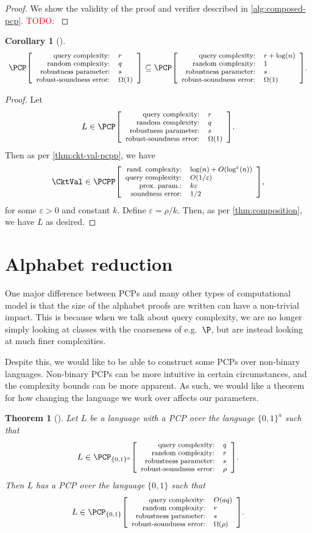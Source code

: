 \documentclass[english,12pt]{reedthesis}
\theoremstyle{plain}
\newtheorem{thm}{Theorem}[section]
\newtheorem{cor}[cor]{Corollary}
\theoremstyle{definition}
\theoremstyle{remark}
\newcommand{\pcpp}[4]{%
  \ensuremath%
  \mleft[{\footnotesize\begin{array}{r l}
    \text{rand.\ complexity:} & #1 \\
    \text{query complexity:} & #2 \\
    \text{prox.\ param.:} & #3 \\
    \text{soundness error:} & #4
  \end{array}}\mright]%
}
\newcommand{\pcpr}[4]{%
  \ensuremath%
  \mleft[{\footnotesize\begin{array}{r l}
    \text{query complexity:} & #1 \\
    \text{random complexity:} & #2 \\
    \text{robustness parameter:} & #3 \\
    \text{robust-soundness error:} & #4
  \end{array}}\mright]%
}
\newcommand{\TODO}[1]{\textcolor{red}{TODO: #1}}
\begin{document}
\begin{proof}
  We show the validity of the proof and verifier described in
  \cref{alg:composed-pcp}.
  \TODO{}
\end{proof}


\begin{cor}[{\cite[Corollary 3.11]{GOS25}}]\label{cor:constant-query}
  \begin{equation}\label{eqn:constant-query}
    \PCP\pcpr{r}{q}{s}{\Omega(1)} \subseteq
    \PCP\pcpr{r + \log(n)}{1}{s}{\Omega(1)}.
  \end{equation}
\end{cor}

\begin{proof}
  Let
  \begin{equation}
    L \in \PCP\pcpr{r}{q}{s}{\Omega(1)}.
  \end{equation}
  Then as per \cref{thm:ckt-val-pcpp}, we have
  \begin{equation}
    \CktVal \in \PCPP\pcpp{\log(n) + O(\log^{\varepsilon}(n))}{O(1/\varepsilon)}{k\varepsilon}{1/2},
  \end{equation}
  for some $\varepsilon > 0$ and constant $k$. Define $\varepsilon = \rho/k$. Then, as per
  \cref{thm:composition}, we have $L$ as desired.
\end{proof}


\section{Alphabet reduction}\label{sec:alph-reduction}

One major difference between PCPs and many other types of computational model is
that the size of the alphabet proofs are written can have a non-trivial impact.
This is because when we talk about query complexity, we are no longer simply
looking at classes with the coarseness of e.g.\ $\P$, but are instead looking at
much finer complexities.

Despite this, we would like to be able to construct some PCPs over non-binary
languages. Non-binary PCPs can be more intuitive in certain circumstances, and
the complexity bounds can be more apparent. As such, we would like a theorem for
how changing the language we work over affects our parameters.

\begin{thm}[{\cite[Lemma 2.13]{BGHSV06}}]%
  \label{thm:alph-reduction}
  Let $L$ be a language with a PCP over the language $\{0, 1\}^{a}$ such
  that
  \[
    L \in \PCP_{\{0, 1\}^{a}}\pcpr{q}{r}{s}{\rho}.
  \]
  Then $L$ has a PCP over the language $\{0, 1\}$ such that
  \[
    L \in \PCP_{\{0, 1\}}\pcpr{O(aq)}{r}{s}{\Omega(\rho)}.
  \]
\end{thm}
\end{document}

